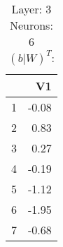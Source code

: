 \begin{table}[ht]
\centering
\begin{tabular}{rr}
  \hline
 & V1 \\ 
  \hline
1 & -0.08 \\ 
  2 & 0.83 \\ 
  3 & 0.27 \\ 
  4 & -0.19 \\ 
  5 & -1.12 \\ 
  6 & -1.95 \\ 
  7 & -0.68 \\ 
   \hline
\end{tabular}
\caption{Layer: 3 Neurons: 6  $(b|W)^T$: 
} 
\end{table}
